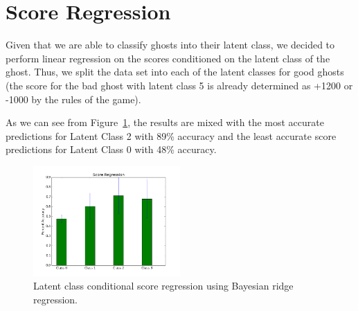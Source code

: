 \documentclass[11pt]{amsart}
\begin{document}
\section{Score Regression}

Given that we are able to classify ghosts into their latent class, we decided to perform linear regression on the scores conditioned on the latent class of the ghost. Thus, we split the data set into each of the latent classes for good ghosts (the score for the bad ghost with latent class 5 is already determined as +1200 or -1000 by the rules of the game). 

As we can see from Figure~\ref{fig:score}, the results are mixed with the most accurate predictions for Latent Class 2 with 89\% accuracy and the least accurate score predictions for Latent Class 0 with 48\% accuracy.

\begin{figure}[b]
	\centering
	\includegraphics[width=0.5\textwidth]{score_regression.png}
	\caption{Latent class conditional score regression using Bayesian ridge regression.}
	\label{fig:score}
\end{figure}
\end{document}
